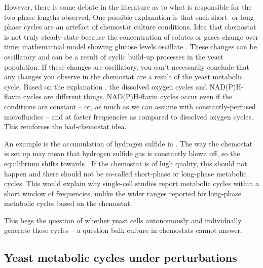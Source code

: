 However, there is some debate in the literature as to what is responsible for the two phase lengths observed.
One possible explanation is that such short- or long-phase cycles are an artefact of chemostat culture conditions.
Idea that chemostat is not truly steady-state because the concentration of solutes or gases change over time; mathematical model showing glucose levels oscillate \citep{jonesCyberneticModelGrowth1999}.
These changes can be oscillatory and can be a result of cyclic build-up processes in the yeast population.
If these changes are oscillatory, you can't necessarily conclude that any changes you observe in the chemostat are a result of the yeast metabolic cycle.
Based on the explanation \citep{jonesCyberneticModelGrowth1999}, the dissolved oxygen cycles and NAD(P)H-flavin cycles are different things.
NAD(P)H-flavin cycles occur even if the conditions are constant -- or, as much as we can assume with constantly-perfused microfluidics -- and at faster frequencies as compared to dissolved oxygen cycles.
This reinforces the bad-chemostat idea.

An example is the accumulation of hydrogen sulfide in \citep{oneillEukaryoticCellBiology2020}.
The way the chemostat is set up may mean that hydrogen sulfide gas is constantly blown off, so the equilibrium shifts towards .
If the chemostat is of high quality, this should not happen and there should not be so-called short-phase or long-phase metabolic cycles.
This would explain why single-cell studies report metabolic cycles within a short window of frequencies, unlike the wider ranges reported for long-phase metabolic cycles based on the chemostat.

This begs the question of whether yeast cells autonomously and individually generate these cycles -- a question bulk culture in chemostats cannot answer.  %

\subsection{Yeast metabolic cycles under perturbations}
\label{subsec:intro-ymc-perturbations}

